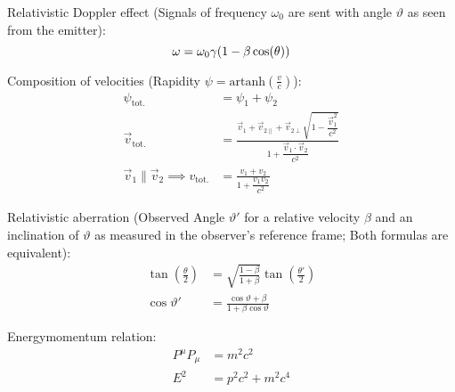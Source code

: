 			\noindent
			Relativistic Doppler effect (Signals of frequency $\omega_0$ are sent with angle $\vartheta$ as seen from the emitter):
			\begin{equation}
				\omega = \omega_0 \gamma \qty(1-\beta\cos(\theta))
			\end{equation}

			\noindent
			Composition of velocities (Rapidity $\psi = \mathrm{artanh}\left(\frac{v}{c}\right)$):
			\begin{equation}
				\begin{aligned}
					\psi_{\text{tot.}} &= \psi_1+\psi_2 \\
					\vec{v}_{\text{tot.}} &= \frac{\vec{v}_1+\vec{v}_{2\parallel}+\vec{v}_{2\perp}\sqrt{1-\dfrac{\vec{v}_1^2}{c^2}}}{1+\dfrac{\vec{v}_1\cdot\vec{v}_2}{c^2}} \\
					\vec{v}_1\parallel\vec{v}_2 \implies v_{\text{tot.}} &= \frac{v_1+v_2}{1+\dfrac{v_1 v_2}{c^2}}
				\end{aligned}
			\end{equation}

			\noindent
			Relativistic aberration (Observed Angle $\vartheta'$ for a relative velocity $\beta$ and an inclination of $\vartheta$ as measured in the observer's reference frame; Both formulas are equivalent):
			\begin{equation}
				\begin{aligned}
					\tan\left(\frac{\theta}{2}\right) &= \sqrt{\frac{1-\beta}{1+\beta}}\tan\left(\frac{\theta'}{2}\right)\\
					\cos\vartheta' &= \frac{\cos\vartheta+\beta}{1+\beta\cos\vartheta}
				\end{aligned}
			\end{equation}

			\noindent
			Energymomentum relation:
			\begin{equation}
				\begin{aligned}
					P^\mu P_\mu &= m^2 c^2\\
					E^2 &= p^2 c^2 + m^2 c^4 \\
				\end{aligned}
			\end{equation}
			\newpage
